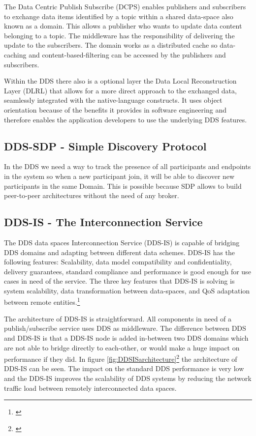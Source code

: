 The Data Centric Publish Subscribe (DCPS) enables publishers and subscribers to exchange data items identified by a topic within a shared data-space also known as a domain. This allows a publisher who wants to update data content belonging to a topic. The middleware has the responsibility of delivering the update to the subscribers. The domain works as a distributed cache so data-caching and content-based-filtering can be accessed by the publishers and subscribers.

Within the DDS there also is a optional layer the Data Local Reconstruction Layer (DLRL) that allows for a more direct approach to the exchanged data, seamlessly integrated with the native-language constructs. It uses object orientation because of the benefits it provides in software engineering and therefore enables the application developers to use the underlying DDS features.

\subsection{DDS-SDP - Simple Discovery Protocol}
In the DDS we need a way to track the presence of all participants and endpoints in the system so when a new participant join, it will be able to discover new participants in the same Domain. This is possible because SDP allows to build peer-to-peer architectures without the need of any broker. 

\subsection{DDS-IS - The Interconnection Service}
The DDS data spaces Interconnection Service (DDS-IS) is capable of bridging DDS domains and adapting between different data schemes. DDS-IS has the following features: Scalability, data model compatibility and confidentiality, delivery guarantees, standard compliance and performance is good enough for use cases in need of the service. The three key features that DDS-IS is solving is system scalability, data transformation between data-spaces, and QoS adaptation between remote entities.\footnote{\cite{Lopez-Vega2013}}

The architecture of DDS-IS is straightforward. All components in need of a publish/subscribe service uses DDS as middleware. The difference between DDS and DDS-IS is that a DDS-IS node is added in-between two DDS domains which are not able to bridge directly to each-other, or would make a huge impact on performance if they did. In figure \ref{fig:DDSISarchitecture}\footnote{\cite{Lopez-Vega2013}} the architecture of DDS-IS can be seen. The impact on the standard DDS performance is very low and the DDS-IS improves the scalability of DDS systems by reducing the network traffic load between remotely interconnected data spaces.

